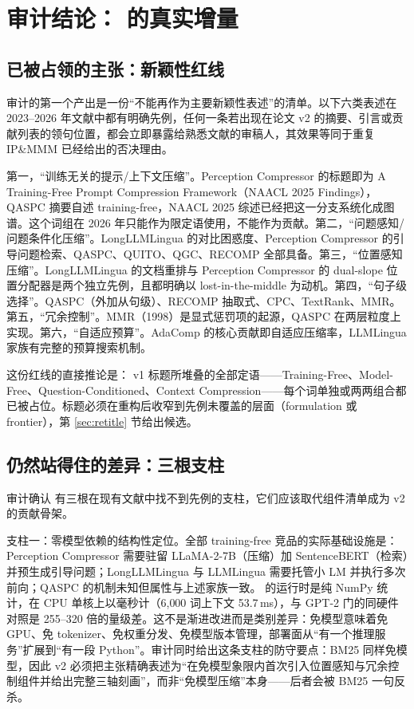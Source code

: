 \section{审计结论：\sieve{} 的真实增量}
\label{sec:delta}

\subsection{已被占领的主张：新颖性红线}

审计的第一个产出是一份``不能再作为主要新颖性表述''的清单。以下六类表述在 2023--2026 年文献中都有明确先例，任何一条若出现在论文 v2 的摘要、引言或贡献列表的领句位置，都会立即暴露给熟悉文献的审稿人，其效果等同于重复 IP\&MMM 已经给出的否决理由。

第一，``训练无关的提示/上下文压缩''。Perception Compressor 的标题即为 A Training-Free Prompt Compression Framework（NAACL 2025 Findings），QASPC 摘要自述 training-free，NAACL 2025 综述已经把这一分支系统化成图谱。这个词组在 2026 年只能作为限定语使用，不能作为贡献。第二，``问题感知/问题条件化压缩''。LongLLMLingua 的对比困惑度、Perception Compressor 的引导问题检索、QASPC、QUITO、QGC、RECOMP 全部具备。第三，``位置感知压缩''。LongLLMLingua 的文档重排与 Perception Compressor 的 dual-slope 位置分配器是两个独立先例，且都明确以 lost-in-the-middle 为动机。第四，``句子级选择''。QASPC（外加从句级）、RECOMP 抽取式、CPC、TextRank、MMR。第五，``冗余控制''。MMR（1998）是显式惩罚项的起源，QASPC 在两层粒度上实现。第六，``自适应预算''。AdaComp 的核心贡献即自适应压缩率，LLMLingua 家族有完整的预算搜索机制。

这份红线的直接推论是：\sieve{} v1 标题所堆叠的全部定语——Training-Free、Model-Free、Question-Conditioned、Context Compression——每个词单独或两两组合都已被占位。标题必须在重构后收窄到先例未覆盖的层面（formulation 或 frontier），第 \ref{sec:retitle} 节给出候选。

\subsection{仍然站得住的差异：三根支柱}

审计确认 \sieve{} 有三根在现有文献中找不到先例的支柱，它们应该取代组件清单成为 v2 的贡献骨架。

支柱一：零模型依赖的结构性定位。全部 training-free 竞品的实际基础设施是：Perception Compressor 需要驻留 LLaMA-2-7B（压缩）加 SentenceBERT（检索）并预生成引导问题；LongLLMLingua 与 LLMLingua 需要托管小 LM 并执行多次前向；QASPC 的机制未知但属性与上述家族一致。\sieve{} 的运行时是纯 NumPy 统计，在 CPU 单核上以毫秒计（6{,}000 词上下文 53.7\,ms），与 GPT-2 门的同硬件对照是 255--320 倍的量级差。这不是渐进改进而是类别差异：免模型意味着免 GPU、免 tokenizer、免权重分发、免模型版本管理，部署面从``有一个推理服务''扩展到``有一段 Python''。审计同时给出这条支柱的防守要点：BM25 同样免模型，因此 v2 必须把主张精确表述为``在免模型象限内首次引入位置感知与冗余控制组件并给出完整三轴刻画''，而非``免模型压缩''本身——后者会被 BM25 一句反杀。


